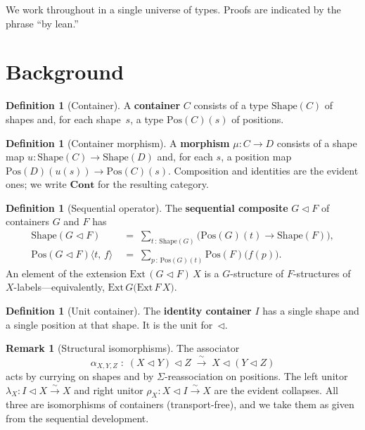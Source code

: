 \documentclass[11pt,a4paper]{article}
\theoremstyle{plain}
\theoremstyle{definition}
\newtheorem{definition}[theorem]{Definition}
\newtheorem{remark}[theorem]{Remark}
\newcommand{\Cont}{\mathbf{Cont}}
\newcommand{\Shape}{\mathrm{Shape}}
\newcommand{\Pos}{\mathrm{Pos}}
\newcommand{\seq}{\mathbin{\triangleleft}}
\begin{document}
We work throughout in a single universe of types. Proofs are indicated by
the phrase ``by lean.''

\section{Background}

\begin{definition}[Container]\label{def:container}
A \textbf{container} $C$ consists of a type $\Shape(C)$ of shapes and,
for each shape~$s$, a type $\Pos(C)(s)$ of positions.
\end{definition}

\begin{definition}[Container morphism]\label{def:morphism}
A \textbf{morphism} $\mu : C \to D$ consists of a shape map
$u : \Shape(C) \to \Shape(D)$ and, for each $s$, a position map
$\Pos(D)(u(s)) \to \Pos(C)(s)$. Composition and identities are the
evident ones; we write $\Cont$ for the resulting category.
\end{definition}

\begin{definition}[Sequential operator]\label{def:seq}
The \textbf{sequential composite} $G \seq F$ of containers $G$ and $F$
has
\begin{align}
  \Shape(G \seq F)
  &\;=\;
  \sum_{t \,:\, \Shape(G)}
  \bigl(\Pos(G)(t) \to \Shape(F)\bigr), \\[4pt]
  \Pos(G \seq F)\bigl\langle t,\, f \bigr\rangle
  &\;=\;
  \sum_{p \,:\, \Pos(G)(t)}
  \Pos(F)\bigl(f(p)\bigr).
\end{align}
An element of the extension $\mathrm{Ext}\,(G \seq F)\,X$ is a
$G$-structure of $F$-structures of $X$-labels---equivalently,
$\mathrm{Ext}\,G\bigl(\mathrm{Ext}\,F\,X\bigr)$.
\end{definition}

\begin{definition}[Unit container]\label{def:I}
The \textbf{identity container} $I$ has a single shape and a single
position at that shape. It is the unit for~$\seq$.
\end{definition}

\begin{remark}[Structural isomorphisms]
The associator
\[
  \alpha_{X,Y,Z}
  \;:\;
  (X \seq Y) \seq Z
  \;\xrightarrow{\;\sim\;}\;
  X \seq (Y \seq Z)
\]
acts by currying on shapes and by $\Sigma$-reassociation on positions.
The left unitor $\lambda_X : I \seq X \xrightarrow{\sim} X$ and right
unitor $\rho_X : X \seq I \xrightarrow{\sim} X$ are the evident
collapses. All three are isomorphisms of containers (transport-free),
and we take them as given from the sequential development.
\end{remark}
\end{document}

